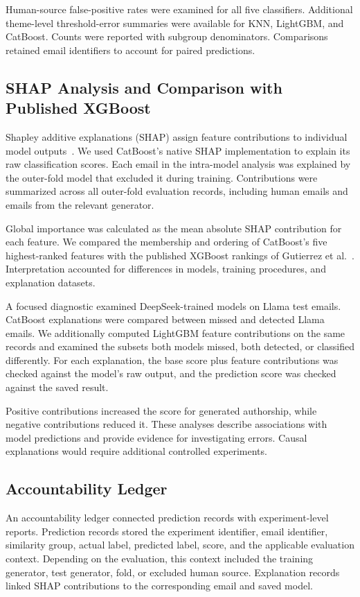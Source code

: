 \documentclass[conference]{IEEEtran}
\begin{document}
Human-source false-positive rates were examined for all five
classifiers. Additional theme-level threshold-error summaries
were available for KNN, LightGBM, and CatBoost. Counts were
reported with subgroup denominators. Comparisons retained
email identifiers to account for paired predictions.

\subsection{SHAP Analysis and Comparison with Published XGBoost}

Shapley additive explanations (SHAP) assign feature contributions
to individual model outputs~\cite{lundberg2017}. We used
CatBoost's native SHAP implementation to explain its raw
classification scores. Each email in the intra-model analysis
was explained by the outer-fold model that excluded it during
training. Contributions were summarized across all outer-fold
evaluation records, including human emails and emails from
the relevant generator.

Global importance was calculated as the mean absolute SHAP
contribution for each feature. We compared the membership
and ordering of CatBoost's five highest-ranked features with
the published XGBoost rankings of Gutierrez
et al.~\cite{gutierrez2026}. Interpretation accounted for
differences in models, training procedures, and explanation
datasets.

A focused diagnostic examined DeepSeek-trained models on
Llama test emails. CatBoost explanations were compared between
missed and detected Llama emails. We additionally computed
LightGBM feature contributions on the same records and examined
the subsets both models missed, both detected, or classified
differently. For each explanation, the base score plus feature
contributions was checked against the model's raw output,
and the prediction score was checked against the saved result.

Positive contributions increased the score for generated
authorship, while negative contributions reduced it. These
analyses describe associations with model predictions and
provide evidence for investigating errors. Causal explanations
would require additional controlled experiments.

\subsection{Accountability Ledger}

An accountability ledger connected prediction records with
experiment-level reports. Prediction records stored the
experiment identifier, email identifier, similarity group,
actual label, predicted label, score, and the applicable
evaluation context. Depending on the evaluation, this context
included the training generator, test generator, fold, or
excluded human source. Explanation records linked SHAP
contributions to the corresponding email and saved model.
\end{document}
